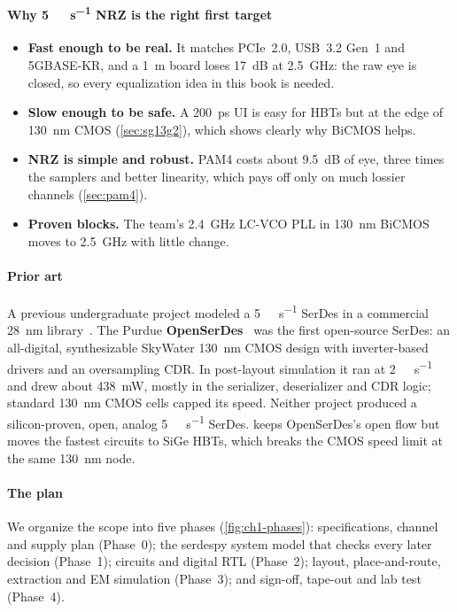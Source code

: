 \paragraph{Why \qty{5}{\giga\bit\per\second} NRZ is the right first target}
\begin{itemize}
  \item \textbf{Fast enough to be real.} It matches PCIe~2.0, USB~3.2 Gen~1 and 5GBASE-KR, and a \qty{1}{\meter} board loses \qty{17}{\deci\bel} at \qty{2.5}{\giga\hertz}: the raw eye is closed, so every equalization idea in this book is needed.
  \item \textbf{Slow enough to be safe.} A \qty{200}{\pico\second} UI is easy for \sgx{} HBTs but at the edge of \qty{130}{\nano\meter} CMOS (\cref{sec:sg13g2}), which shows clearly why BiCMOS helps.
  \item \textbf{NRZ is simple and robust.} PAM4 costs about \qty{9.5}{\deci\bel} of eye, three times the samplers and better linearity, which pays off only on much lossier channels (\cref{sec:pam4}).
  \item \textbf{Proven blocks.} The team's \qty{2.4}{\giga\hertz} LC-VCO PLL in \qty{130}{\nano\meter} BiCMOS~\cite{smacd2026pll} moves to \qty{2.5}{\giga\hertz} with little change.
\end{itemize}

\paragraph{Prior art} A previous undergraduate project modeled a \qty{5}{\giga\bit\per\second} SerDes in a commercial \qty{28}{\nano\meter} library~\cite{p1:serasinghe2016}. The Purdue \textbf{OpenSerDes}~\cite{openserdes2021} was the first open-source SerDes: an all-digital, synthesizable SkyWater \qty{130}{\nano\meter} CMOS design with inverter-based drivers and an oversampling CDR. In post-layout simulation it ran at \qty{2}{\giga\bit\per\second} and drew about \qty{438}{\milli\watt}, mostly in the serializer, deserializer and CDR logic; standard \qty{130}{\nano\meter} CMOS cells capped its speed. Neither project produced a silicon-proven, open, analog \qty{5}{\giga\bit\per\second} SerDes. \OS{} keeps OpenSerDes's open flow but moves the fastest circuits to SiGe HBTs, which breaks the CMOS speed limit at the same \qty{130}{\nano\meter} node.

\paragraph{The plan} We organize the scope into five phases (\cref{fig:ch1-phases}): specifications, channel and supply plan (Phase~0); the serdespy system model that checks every later decision (Phase~1); circuits and digital RTL (Phase~2); layout, place-and-route, extraction and EM simulation (Phase~3); and sign-off, tape-out and lab test (Phase~4).

